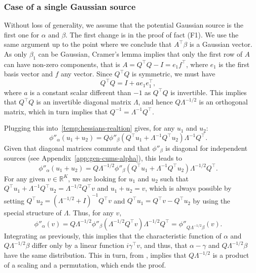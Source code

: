 \documentclass{article}
\newcommand{\R}{\mathbb{R}}
\begin{document}
\subsubsection{Case of a single Gaussian source}
Without loss of generality, we assume that the potential Gaussian source is the first one for $\alpha$ and $\beta$.
The first change is in the proof of fact (F1). We use the same argument up to the point where we conclude that $A^\top \beta$ is a Gaussian vector. As only $\beta_1$ can be Gaussian, Cramer's lemma implies that only the first row of $A$ can have non-zero components, that is $A = Q^\top Q  - I = e_1 f^\top$, where $e_1$ is the first basis vector and $f$ any vector. Since $Q^\top Q$ is symmetric, we must have 
$$
Q^\top Q  = I + a e_1 e_1^{\top},
$$
where  $a$ is a constant scalar different than $-1$ as $Q^\top Q $ is invertible. This implies that
$Q^\top Q$ is an invertible diagonal matrix $\Lambda$, and hence
$Q \Lambda^{-1/2}$ is an orthogonal matrix, which in turn implies that $Q^{-1} = \Lambda^{-1} Q^\top$.

Plugging this into~\eqref{temp:hessians-realtion} gives, for any $u_1$ and $u_2$:
$$
 \phi''_{\alpha} (u_1 + u_2) = Q \phi''_{\beta} (Q^{\top} u_1 + \Lambda^{-1} Q^{\top}u_2) \Lambda^{-1} Q^{\top}.
$$
Given that diagonal matrices commute and that $\phi''_{\beta}$ is diagonal for independent sources (see Appendix~\ref{app:gen-cums-alpha}), this leads to
$$
 \phi''_{\alpha} (u_1 + u_2) = Q \Lambda^{-1/2} \phi''_{\beta} (Q^{\top} u_1 + \Lambda^{-1} Q^{\top}u_2) \Lambda^{-1/2} Q^{\top}.
$$
For any given $v \in \R^K$, we are looking for $u_1$ and $u_2$ such that 
$Q^{\top} u_1 + \Lambda^{-1} Q^{\top}u_2 = \Lambda^{-1/2} Q^\top  v$ and $u_1+u_2=v$, which is always possible by setting
$Q^\top u_2 = (\Lambda^{-1/2} + I)^{-1} Q^\top v$ and $Q^\top u_1 = Q^\top v - Q^\top u_2$ by using the special structure of $\Lambda$. Thus, for any $v$,
$$
 \phi''_{\alpha} (v) = Q \Lambda^{-1/2} \phi''_{\beta} (\Lambda^{-1/2} Q^\top  v) \Lambda^{-1/2} Q^{\top}
 =  \phi''_{Q \Lambda^{-1/2} \beta} ( v).
$$
Integrating as previously, this implies that the characteristic function of $\alpha$ and $Q \Lambda^{-1/2} \beta $ differ only by a linear function $i \gamma^\top v$, and thus, that $\alpha - \gamma$ and $Q \Lambda^{-1/2} \beta$ have the same distribution. This in turn, from \citet[Theorem 11]{Com1994}, implies that $Q \Lambda^{-1/2} $ is a product of a scaling and a permutation, which ends the proof.
\end{document}
